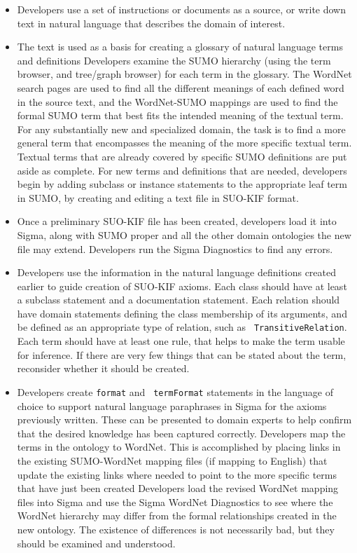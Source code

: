 \documentclass{book}
\begin{document}
\begin{itemize}

\item Developers use a set of instructions or documents as a source, or write
down text in natural language that describes the domain of interest.

\item The text is used as a basis for creating a glossary of natural language
terms and definitions Developers examine the SUMO hierarchy (using the term
browser, and tree/graph browser) for each term in the glossary. The WordNet
search pages are used to find all the different meanings of each defined word in
the source text, and the WordNet-SUMO mappings are used to find the formal SUMO
term that best fits the intended meaning of the textual term.  For any
substantially new and specialized domain, the task is to find a more general
term that encompasses the meaning of the more specific textual term. Textual
terms that are already covered by specific SUMO definitions are put aside as
complete. For new terms and definitions that are needed, developers begin by
adding subclass or instance statements to the appropriate leaf term in SUMO, by
creating and editing a text file in SUO-KIF format.

\item Once a preliminary SUO-KIF file has been created, developers load it into
Sigma, along with SUMO proper and all the other domain ontologies the new file
may extend. Developers run the Sigma Diagnostics to find any errors.

\item Developers use the information in the natural language definitions created
earlier to guide creation of SUO-KIF axioms. Each class should have at least a
subclass statement and a documentation statement. Each relation should have
domain statements defining the class membership of its arguments, and be defined
as an appropriate type of relation, such as {\tt
TransitiveRelation}. Each term should have at least
one rule, that helps to make the term usable for inference. If there are very
few things that can be stated about the term, reconsider whether it should be
created.

\item Developers create {\tt format} and {\tt
termFormat} statements in the language of choice to support
natural language paraphrases in Sigma for the axioms previously written. These
can be presented to domain experts to help confirm that the desired knowledge
has been captured correctly. Developers map the terms in the ontology to
WordNet. This is accomplished by placing links in the existing SUMO-WordNet
mapping files (if mapping to English) that update the existing links where
needed to point to the more specific terms that have just been created
Developers load the revised WordNet mapping files into Sigma and use the Sigma
WordNet Diagnostics to see where the WordNet hierarchy may differ from the
formal relationships created in the new ontology. The existence of differences
is not necessarily bad, but they should be examined and understood.


\end{itemize}
\end{document}
